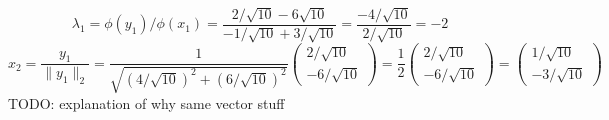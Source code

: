 \documentclass[11pt]{article}
\begin{document}
\begin{exercise}{1}
{\begin{enumerate}[label=\alph*)]
            $$ \lambda _1 = \phi (y_1) / \phi (x_1) = \dfrac{2/\sqrt{10} - 6\sqrt{10}}{-1/\sqrt{10} + 3/\sqrt{10}} = \dfrac{-4/\sqrt{10}}{2/\sqrt{10}} = -2 $$
            $$ x_2 = \dfrac{y_1}{\| y_1 \| _2} = \dfrac{1}{\sqrt{(4/\sqrt{10})^2 + (6/\sqrt{10})^2}} \begin{pmatrix} 2/\sqrt{10} \\ -6/\sqrt{10} \end{pmatrix} = \dfrac{1}{2} \begin{pmatrix} 2/\sqrt{10} \\ -6/\sqrt{10} \end{pmatrix} = \begin{pmatrix} 1/\sqrt{10} \\ -3/\sqrt{10} \end{pmatrix} $$
            TODO: explanation of why same vector stuff
        \end{enumerate}
    }
\end{exercise}

\newpage

\end{document}
